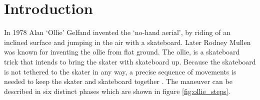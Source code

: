 \documentclass[default,iicol]{sn-jnl}
\theoremstyle{thmstyleone}%
\theoremstyle{thmstyletwo}%
\theoremstyle{thmstylethree}%
\begin{document}

\maketitle

\section{Introduction}\label{s_intro}

In 1978 Alan `Ollie' Gelfand invented the `no-hand aerial', by riding of an
inclined surface and jumping in the air with a skateboard. Later Rodney Mullen
was known for inventing the ollie from flat ground. The ollie, is a skateboard
trick that intends to bring the skater with skateboard up. Because the
skateboard is not tethered to the skater in any way, a precise sequence of
movements is needed to keep the skater and skateboard together
\cite{frederick_biomechanics_2006}. The maneuver can be described in six
distinct phases which are shown in figure \ref{fig:ollie_steps}.
\end{document}
